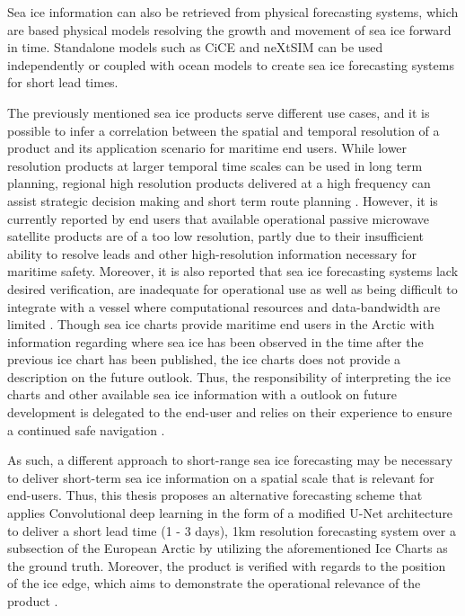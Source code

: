 \documentclass[../main/thesis.tex]{subfiles}
\begin{document}
Sea ice information can also be retrieved from physical forecasting systems, which are based physical models resolving the growth and movement of sea ice forward in time. Standalone models such as CiCE \citep{Hunke1997} and neXtSIM \citep{Williams2021} can be used independently or coupled with ocean models to create sea ice forecasting systems for short lead times. 

The previously mentioned sea ice products serve different use cases, and it is possible to infer a correlation between the spatial and temporal resolution of a product and its application scenario for maritime end users. While lower resolution products at larger temporal time scales can be used in long term planning, regional high resolution products delivered at a high frequency can assist strategic decision making and short term route planning \citep{Wagner2020}. However, it is currently reported by end users that available operational passive microwave satellite products are of a too low resolution, partly due to their insufficient ability to resolve leads and other high-resolution information necessary for maritime safety. Moreover, it is also reported that sea ice forecasting systems lack desired verification, are inadequate for operational use as well as being difficult to integrate with a vessel where computational resources and data-bandwidth are limited \citep{Veland2021}. Though sea ice charts provide maritime end users in the Arctic with information regarding where sea ice has been observed in the time after the previous ice chart has been published, the ice charts does not provide a description on the future outlook. Thus, the responsibility of interpreting the ice charts and other available sea ice information with a outlook on future development is delegated to the end-user and relies on their experience to ensure a continued safe navigation \citep{Veland2021}.

As such, a different approach to short-range sea ice forecasting may be necessary to deliver short-term sea ice information on a spatial scale that is relevant for end-users. Thus, this thesis proposes an alternative forecasting scheme that applies Convolutional deep learning in the form of a modified U-Net architecture \citep{Ronneberger2015} to deliver a short lead time (1 - 3 days), 1km resolution forecasting system over a subsection of the European Arctic by utilizing the aforementioned Ice Charts as the ground truth. Moreover, the product is verified with regards to the position of the ice edge, which aims to demonstrate the operational relevance of the product \citep{Veland2021, Melsom2019}. 
\end{document}
